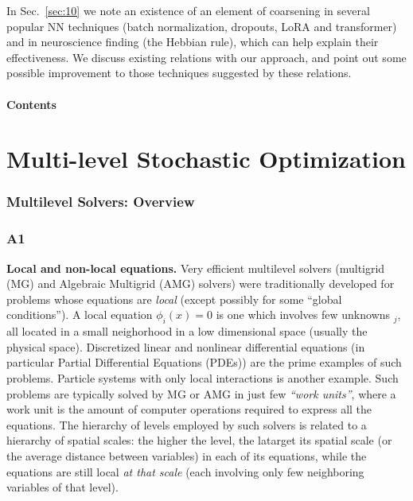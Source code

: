 \documentclass{article} %
\begin{document}
In Sec.~\ref{sec:10} we note an existence of an element of coarsening in several popular NN techniques (batch normalization, dropouts, LoRA and transformer) and in neuroscience finding (the Hebbian rule), which can help explain their effectiveness. We discuss existing relations with our approach, and point out some possible improvement to those techniques suggested by these relations.

\subsection{Contents}
\tableofcontents


\newpage
\part{Multi-level Stochastic Optimization}
\label{sec:stochastic_optimization}

\section{Multilevel Solvers: Overview}
\section{A1}
{\bf Local and non-local equations.} Very efficient multilevel solvers (multigrid (MG) and Algebraic Multigrid (AMG) solvers) were traditionally developed for problems whose equations are {\it local} (except possibly for some ``global conditions''). A local equation $\phi_i(x)=0$ is one which involves few unknowns $_j$, all located in a small neighorhood in a low dimensional space (usually the physical space). Discretized linear and nonlinear differential equations (in particular Partial Differential Equations (PDEs)) are the prime examples of such problems. Particle systems with only local interactions is another example. Such problems are typically solved by MG or AMG in just few {\it ``work units''}, where a work unit is the amount of computer operations required to express all the equations. The hierarchy of levels employed by such solvers is related to a hierarchy of spatial scales: the higher the level, the latarget its spatial scale (or the average distance between variables) in each of its equations, while the equations are still local {\it at that scale} (each involving only few neighboring variables of that level).
\end{document}

